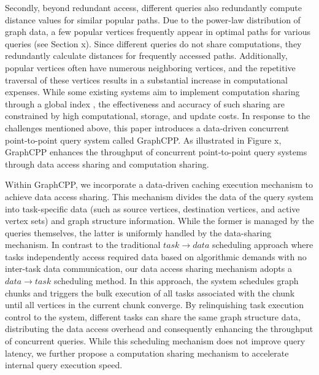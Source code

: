 \documentclass[lettersize,journal]{IEEEtran} %
\begin{document}
Secondly, beyond redundant access, different queries also redundantly compute distance values for similar popular paths. Due to the power-law distribution of graph data, a few popular vertices frequently appear in optimal paths for various queries (see Section x). Since different queries do not share computations, they redundantly calculate distances for frequently accessed paths. Additionally, popular vertices often have numerous neighboring vertices, and the repetitive traversal of these vertices results in a substantial increase in computational expenses. While some existing systems aim to implement computation sharing through a global index \cite{tripoline}\cite{sgraph}, the effectiveness and accuracy of such sharing are constrained by high computational, storage, and update costs.
In response to the challenges mentioned above, this paper introduces a data-driven concurrent point-to-point query system called GraphCPP. As illustrated in Figure x, GraphCPP enhances the throughput of concurrent point-to-point query systems through data access sharing and computation sharing.

Within GraphCPP, we incorporate a data-driven caching execution mechanism to achieve data access sharing. This mechanism divides the data of the query system into task-specific data (such as source vertices, destination vertices, and active vertex sets) and graph structure information. While the former is managed by the queries themselves, the latter is uniformly handled by the data-sharing mechanism. In contrast to the traditional $task \rightarrow data$ scheduling approach where tasks independently access required data based on algorithmic demands with no inter-task data communication, our data access sharing mechanism adopts a $data \rightarrow task$ scheduling method. In this approach, the system schedules graph chunks and triggers the bulk execution of all tasks associated with the chunk until all vertices in the current chunk converge. By relinquishing task execution control to the system, different tasks can share the same graph structure data, distributing the data access overhead and consequently enhancing the throughput of concurrent queries. While this scheduling mechanism does not improve query latency, we further propose a computation sharing mechanism to accelerate internal query execution speed.
\end{document}
